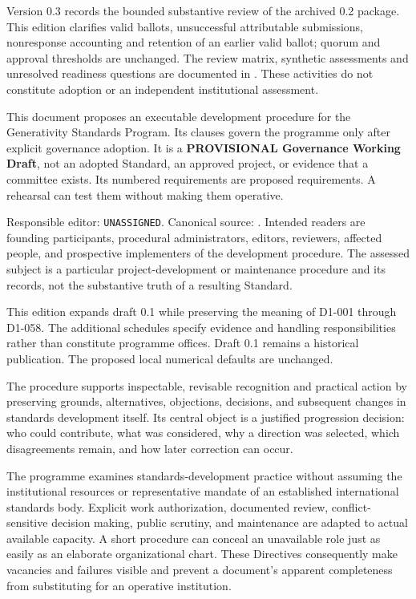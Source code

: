 \documentclass[11pt,a4paper]{article}
\begin{document}
\GSPfrontmatter
{}
Version 0.3 records the bounded substantive review of the archived 0.2 package. This edition clarifies valid ballots, unsuccessful attributable submissions, nonresponse accounting and retention of an earlier valid ballot; quorum and approval thresholds are unchanged. The review matrix, synthetic assessments and unresolved readiness questions are documented in . These activities do not constitute adoption or an independent institutional assessment.

This document proposes an executable development procedure for the Generativity Standards Program. Its clauses govern the programme only after explicit governance adoption. It is a \textbf{PROVISIONAL Governance Working Draft}, not an adopted Standard, an approved project, or evidence that a committee exists. Its numbered requirements are proposed requirements. A rehearsal can test them without making them operative.

Responsible editor: \texttt{UNASSIGNED}. Canonical source: . Intended readers are founding participants, procedural administrators, editors, reviewers, affected people, and prospective implementers of the development procedure. The assessed subject is a particular project-development or maintenance procedure and its records, not the substantive truth of a resulting Standard.

This edition expands draft 0.1 while preserving the meaning of D1-001 through D1-058. The additional schedules specify evidence and handling responsibilities rather than constitute programme offices. Draft 0.1 remains a historical publication. The proposed local numerical defaults are unchanged.

\tableofcontents\clearpage
{}
The procedure supports inspectable, revisable recognition and practical action by preserving grounds, alternatives, objections, decisions, and subsequent changes in standards development itself. Its central object is a justified progression decision: who could contribute, what was considered, why a direction was selected, which disagreements remain, and how later correction can occur.

The programme examines standards-development practice without assuming the institutional resources or representative mandate of an established international standards body. Explicit work authorization, documented review, conflict-sensitive decision making, public scrutiny, and maintenance are adapted to actual available capacity. A short procedure can conceal an unavailable role just as easily as an elaborate organizational chart. These Directives consequently make vacancies and failures visible and prevent a document's apparent completeness from substituting for an operative institution.
\end{document}
